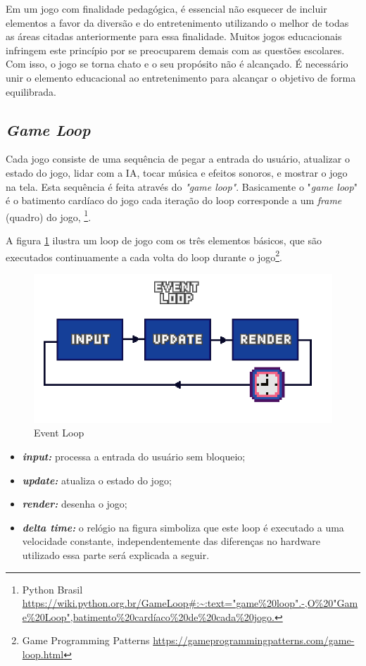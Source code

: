Em um jogo com finalidade pedagógica, é essencial não esquecer de incluir elementos a favor da diversão e do entretenimento utilizando o melhor de todas as áreas citadas anteriormente para essa finalidade. Muitos jogos educacionais infringem este princípio por se preocuparem demais com as questões escolares. Com isso, o jogo se torna chato e o seu propósito não é alcançado. É necessário unir o elemento educacional ao entretenimento para alcançar o objetivo de forma equilibrada.

\subsection{\textit{Game Loop}}
\label{sec:game-loop}
Cada jogo consiste de uma sequência de pegar a entrada do usuário, atualizar o estado do jogo, lidar com a IA, tocar música e efeitos sonoros, e mostrar o jogo na tela. Esta sequência é feita através do \textit{"game loop"}. Basicamente o "\textit{game loop}" é o batimento cardíaco do jogo cada iteração do loop corresponde a um \textit{frame} (quadro) do jogo, \footnote{Python Brasil \url{https://wiki.python.org.br/GameLoop#:~:text="game%20loop".-,O%20"Game%20Loop",batimento%20cardíaco%20de%20cada%20jogo.}}.

A figura \ref{fig:event-loop} ilustra um loop de jogo com os três elementos básicos, que são executados continuamente a cada volta do loop durante o jogo\footnote{Game Programming Patterns \url{https://gameprogrammingpatterns.com/game-loop.html}}.


\begin{figure}[h!]
    \centering
    \includegraphics[width=1\linewidth]{figuras/event-loop.png}
    \caption{Event Loop}
    \label{fig:event-loop}
\end{figure}

\begin{itemize}
    \item \textit{\textbf{input:}} processa a entrada do usuário sem bloqueio;
    \item \textit{\textbf{update:}} atualiza o estado do jogo;
    \item \textit{\textbf{render:}}  desenha o jogo;
    \item \textit{\textbf{delta time:}} o relógio na figura simboliza que este loop é executado a uma velocidade constante, independentemente das diferenças no hardware utilizado essa parte será explicada a seguir. 
\end{itemize}

